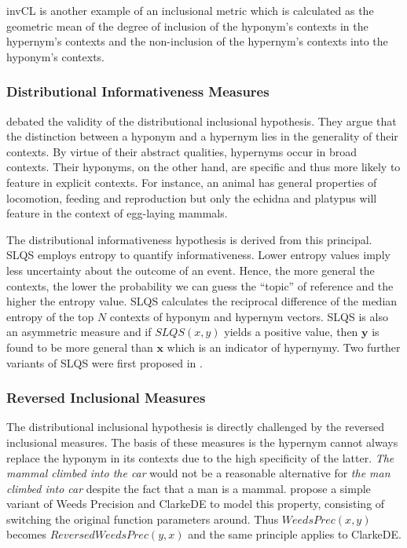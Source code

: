 invCL \citep{lenci2012identifying} is another example of an inclusional metric which is calculated as the geometric mean of the degree of inclusion of the hyponym’s contexts in the hypernym’s contexts  and the non-inclusion of the hypernym’s contexts into the hyponym’s contexts.


\subsubsection{Distributional Informativeness Measures}
\citeauthor{santus2014chasing} debated the validity of the distributional inclusional hypothesis.  They argue that the distinction between a hyponym and a hypernym lies in the generality of their contexts.  By virtue of their abstract qualities, hypernyms occur in broad contexts.  Their hyponyms, on the other hand, are specific and thus more likely to feature in explicit contexts.  For instance, an animal has general properties of locomotion, feeding and reproduction but only the echidna and platypus will feature in the context of egg-laying mammals.

The distributional informativeness hypothesis is derived from this principal.  SLQS \citep{santus2014chasing} employs entropy to quantify informativeness.  Lower entropy values imply less uncertainty about the outcome of an event.  Hence, the more general the contexts, the lower the probability we can guess the “topic” of reference and the higher the entropy value.  SLQS calculates the reciprocal difference of the median entropy of the top $N$ contexts of hyponym and hypernym vectors.  SLQS is also an asymmetric measure and if $SLQS(x, y)$ yields a positive value, then $\textbf{y}$ is found to be more general than $\textbf{x}$ which is an indicator of hypernymy.  Two further variants of SLQS were first proposed in \citep{shwartz2017siege}.

\subsubsection{Reversed Inclusional Measures}
The distributional inclusional hypothesis is directly challenged by the reversed inclusional measures.  The basis of these measures is the hypernym cannot always replace the hyponym in its contexts due to the high specificity of the latter.  \textit{The mammal climbed into the car} would not be a reasonable alternative for \textit{the man climbed into car} despite the fact that a man is a mammal.  \citep{shwartz2017siege} propose a simple variant of Weeds Precision and ClarkeDE to model this property, consisting of switching the original function parameters around.  Thus $WeedsPrec(x,y)$ becomes $ReversedWeedsPrec(y, x)$ and the same principle applies to ClarkeDE.

